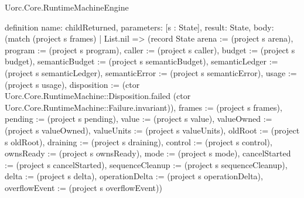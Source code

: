\begin{lexlean}{Uorc.Core.RuntimeMachineEngine}
\begin{semanticmodule}
definition{
  name: childReturned,
  parameters: [s : State],
  result: State,
  body: (match (project s frames)
    | List.nil => (record State {arena := (project s arena), program := (project s program), caller := (project s caller), budget := (project s budget), semanticBudget := (project s semanticBudget), semanticLedger := (project s semanticLedger), semanticError := (project s semanticError), usage := (project s usage), disposition := (ctor Uorc.Core.RuntimeMachine::Disposition.failed (ctor Uorc.Core.RuntimeMachine::Failure.invariant)), frames := (project s frames), pending := (project s pending), value := (project s value), valueOwned := (project s valueOwned), valueUnits := (project s valueUnits), oldRoot := (project s oldRoot), draining := (project s draining), control := (project s control), ownsReady := (project s ownsReady), mode := (project s mode), cancelStarted := (project s cancelStarted), sequenceCleanup := (project s sequenceCleanup), delta := (project s delta), operationDelta := (project s operationDelta), overflowEvent := (project s overflowEvent)})
}
\end{semanticmodule}
\end{lexlean}
